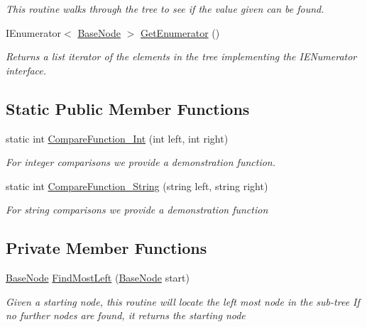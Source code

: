 \begin{DoxyCompactItemize}
\begin{DoxyCompactList}\small\item\em This routine walks through the tree to see if the value given can be found. \end{DoxyCompactList}\item 
I\+Enumerator$<$ \hyperlink{class_c_p_u___o_s___simulator_1_1_compiler_1_1_frontend_1_1_syntax_tree_1_1_base_node}{Base\+Node} $>$ \hyperlink{class_c_p_u___o_s___simulator_1_1_compiler_1_1_frontend_1_1_syntax_tree_1_1_a_s_t_aceaad03d78fc54155a4c18a13ac89e92}{Get\+Enumerator} ()
\begin{DoxyCompactList}\small\item\em Returns a list iterator of the elements in the tree implementing the I\+E\+Numerator interface. \end{DoxyCompactList}\end{DoxyCompactItemize}
\subsection*{Static Public Member Functions}
\begin{DoxyCompactItemize}
\item 
static int \hyperlink{class_c_p_u___o_s___simulator_1_1_compiler_1_1_frontend_1_1_syntax_tree_1_1_a_s_t_ae5a39e32b179110397b6e556d0a2b3d7}{Compare\+Function\+\_\+\+Int} (int left, int right)
\begin{DoxyCompactList}\small\item\em For integer comparisons we provide a demonstration function. \end{DoxyCompactList}\item 
static int \hyperlink{class_c_p_u___o_s___simulator_1_1_compiler_1_1_frontend_1_1_syntax_tree_1_1_a_s_t_ad66f655202794d09ce58ef9fcc690a34}{Compare\+Function\+\_\+\+String} (string left, string right)
\begin{DoxyCompactList}\small\item\em For string comparisons we provide a demonstration function \end{DoxyCompactList}\end{DoxyCompactItemize}
\subsection*{Private Member Functions}
\begin{DoxyCompactItemize}
\item 
\hyperlink{class_c_p_u___o_s___simulator_1_1_compiler_1_1_frontend_1_1_syntax_tree_1_1_base_node}{Base\+Node} \hyperlink{class_c_p_u___o_s___simulator_1_1_compiler_1_1_frontend_1_1_syntax_tree_1_1_a_s_t_ad6c751aec63a7123d0e472639a32ed5a}{Find\+Most\+Left} (\hyperlink{class_c_p_u___o_s___simulator_1_1_compiler_1_1_frontend_1_1_syntax_tree_1_1_base_node}{Base\+Node} start)
\begin{DoxyCompactList}\small\item\em Given a starting node, this routine will locate the left most node in the sub-\/tree If no further nodes are found, it returns the starting node \end{DoxyCompactList}\end{DoxyCompactItemize}
